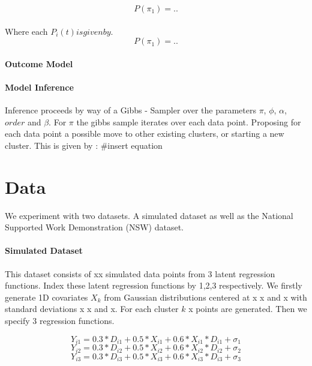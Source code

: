 \documentclass{article}
\begin{document}
\begin{equation}
\label{eqn:EPA Distribution}
P(\pi_1) = ..
\end{equation}
\\ Where each $P_i(t) is given by.$
\begin{equation}
\label{eqn:EPA Distribution}
P(\pi_1) = ..
\end{equation}

\paragraph{Outcome Model}

\paragraph{Model Inference} 
Inference proceeds by way of a Gibbs - Sampler over the parameters $\pi$, $\phi$, $\alpha$, $order$ and $\beta$. For $\pi$ the gibbs sample iterates over each data point. Proposing for each data point a possible move to other existing clusters, or starting a new cluster. This is given by :
#insert equation


\section{Data}

We experiment with two datasets. A simulated dataset as well as the National Supported Work Demonstration (NSW) dataset.

\paragraph{Simulated Dataset} This dataset consists of xx simulated data points from 3 latent regression functions. Index these latent regression functions by 1,2,3 respectively. We firstly generate 1D covariates $X_k$ from Gaussian distributions centered at x x and x with standard deviations x x and x. For each cluster $k$ x points are generated. Then we specify 3 regression functions.

\begin{equation}
\label{eqn:latent_reg1}
Y_{i1} = 0.3 * D_{i1} + 0.5*X_{i1} + 0.6*X_{i1}*D_{i1} + \sigma_1
\end{equation}
\begin{equation}
\label{eqn:latent_reg1}
Y_{i2} = 0.3 * D_{i2} + 0.5*X_{i2} + 0.6*X_{i2}*D_{i2} + \sigma_2
\end{equation}
\begin{equation}
\label{eqn:latent_reg1}
Y_{i3} = 0.3 * D_{i3} + 0.5*X_{i3} + 0.6*X_{i3}*D_{i3} + \sigma_3
\end{equation}
\end{document}
